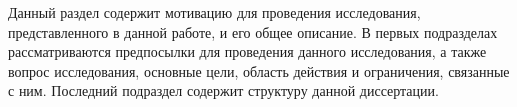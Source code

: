 %
Данный раздел содержит мотивацию для проведения исследования, представленного в данной работе, и его общее описание.
%
В первых подразделах рассматриваются предпосылки для проведения данного исследования, а также вопрос исследования, основные цели, область действия и ограничения, связанные с ним.
%
Последний подраздел содержит структуру данной диссертации.